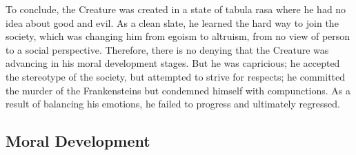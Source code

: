 \begin{text}
To conclude, the Creature was created in a state of tabula rasa where he had no idea about good and evil. As a clean slate, he learned the hard way to join the society, which was changing him from egoism to altruism, from no view of person to a social perspective. Therefore, there is no denying that the Creature was advancing in his moral development stages. But he was capricious; he accepted the stereotype of the society, but attempted to strive for respects; he committed the murder of the Frankensteins but condemned himself with compunctions. As a result of balancing his emotions, he failed to progress and ultimately regressed.

\end{text}
\subsection{Moral Development} %
\label{sub:moral_development}
